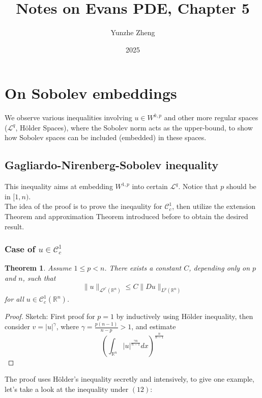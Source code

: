 \documentclass{article}
\title{Notes on Evans PDE, Chapter 5}
\author{Yunzhe Zheng}
\date{2025}
\begin{document}
\maketitle

\section{On Sobolev embeddings}

\indent\indent We observe various inequalities involving $u\in W^{k, p}$ and other more regular spaces ($\mathscr{L}^q$, Hölder Spaces), where the Sobolev norm acts as the upper-bound, to show how Sobolev spaces can be included (embedded) in these spaces.

\subsection{Gagliardo-Nirenberg-Sobolev inequality}

\indent\indent This inequality aims at embedding $W^{1, p}$ into certain $\mathscr{L}^{q}$. Notice that $p$ should be in $[1, n)$. \\
\indent The idea of the proof is to prove the ineqaulity for $\mathscr{C}^1_c$, then utilize the extension Theorem and approximation Theorem introduced before to obtain the desired result. 

\subsubsection{Case of $u\in\mathscr{C}^1_{c}$}

\newtheorem{Th}{Theorem}

\begin{Th}
    Assume $1\leq p<n$. There exists a constant $C$, depending only on $p$ and $n$, such that
    $$
    \|u\|_{\mathscr{L}^{p^*}(\mathbb{R}^{n})}\leq C\|Du\|_{L^{p}(\mathbb{R}^{n})}
    $$
    for all $u\in\mathscr{C}^{1}_{c}(\mathbb{R}^n)$.
\end{Th}

\begin{proof}
    Sketch: First proof for $p=1$ by inductively using Hölder inequality, then consider $v=|u|^{\gamma}$, where $\gamma=\frac{p(n-1)}{n-p}>1$, and estimate 
    $$
    \left(\int_{\mathbb{R}^n}|u|^{\frac{\gamma n}{n-1}}dx\right)^{\frac{n}{n-1}}
    $$
\end{proof}
The proof uses Hölder's inequality secretly and intensively, to give one example, let's take a look at the inequality under $(12)$: 
\end{document}
